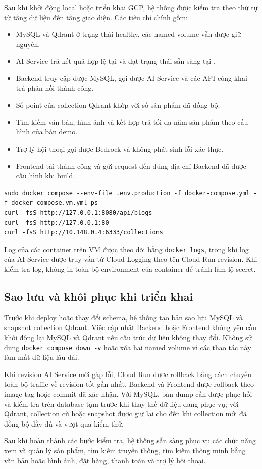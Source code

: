 Sau khi khởi động local hoặc triển khai GCP, hệ thống được kiểm tra theo thứ tự từ tầng dữ liệu đến tầng giao diện. Các tiêu chí chính gồm:

\begin{itemize}
    \item MySQL và Qdrant ở trạng thái healthy, các named volume vẫn được giữ nguyên.
    \item AI Service trả kết quả hợp lệ tại  và đạt trạng thái sẵn sàng tại .
    \item Backend truy cập được MySQL, gọi được AI Service và các API công khai trả phản hồi thành công.
    \item Số point của collection Qdrant khớp với số sản phẩm đã đồng bộ.
    \item Tìm kiếm văn bản, hình ảnh và kết hợp trả tối đa năm sản phẩm theo cấu hình của bản demo.
    \item Trợ lý hội thoại gọi được Bedrock và không phát sinh lỗi xác thực.
    \item Frontend tải thành công và gửi request đến đúng địa chỉ Backend đã được cấu hình khi build.
\end{itemize}

\begin{lstlisting}[style=terminal,caption={Kiểm tra nhanh các container trên GCE VM},label={lst:gce-deployment-check}]
sudo docker compose --env-file .env.production -f docker-compose.yml -f docker-compose.vm.yml ps
curl -fsS http://127.0.0.1:8080/api/blogs
curl -fsS http://127.0.0.1:80
curl -fsS http://10.148.0.4:6333/collections
\end{lstlisting}

Log của các container trên VM được theo dõi bằng \texttt{docker logs}, trong khi log của AI Service được truy vấn từ Cloud Logging theo tên Cloud Run revision. Khi kiểm tra log, không in toàn bộ environment của container để tránh làm lộ secret.

\subsection{Sao lưu và khôi phục khi triển khai}

Trước khi deploy hoặc thay đổi schema, hệ thống tạo bản sao lưu MySQL và snapshot collection Qdrant. Việc cập nhật Backend hoặc Frontend không yêu cầu khởi động lại MySQL và Qdrant nếu cấu trúc dữ liệu không thay đổi. Không sử dụng \texttt{docker compose down -v} hoặc xóa hai named volume vì các thao tác này làm mất dữ liệu lâu dài.

Khi revision AI Service mới gặp lỗi, Cloud Run được rollback bằng cách chuyển toàn bộ traffic về revision tốt gần nhất. Backend và Frontend được rollback theo image tag hoặc commit đã xác nhận. Với MySQL, bản dump cần được phục hồi và kiểm tra trên database tạm trước khi thay thế dữ liệu đang phục vụ; với Qdrant, collection cũ hoặc snapshot được giữ lại cho đến khi collection mới đã đồng bộ đầy đủ và vượt qua kiểm thử.

Sau khi hoàn thành các bước kiểm tra, hệ thống sẵn sàng phục vụ các chức năng xem và quản lý sản phẩm, tìm kiếm truyền thống, tìm kiếm thông minh bằng văn bản hoặc hình ảnh, đặt hàng, thanh toán và trợ lý hội thoại.
